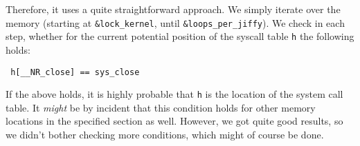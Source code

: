 \documentclass[10pt, letterpaper]{scrartcl}
\begin{document}
Therefore, it uses a quite straightforward approach. We simply iterate over the memory (starting at \texttt{\&lock\_kernel}, until \texttt{\&loops\_per\_jiffy}). We check in each step, whether for the current potential position of the syscall table \texttt{h} the following holds:

\begin{verbatim}
 h[__NR_close] == sys_close
\end{verbatim}

If the above holds, it is highly probable that \texttt{h} is the location of the system call table. It \emph{might} be by incident that this condition holds for other memory locations in the specified section as well. However, we got quite good results, so we didn't bother checking more conditions, which might of course be done.
\end{document}
